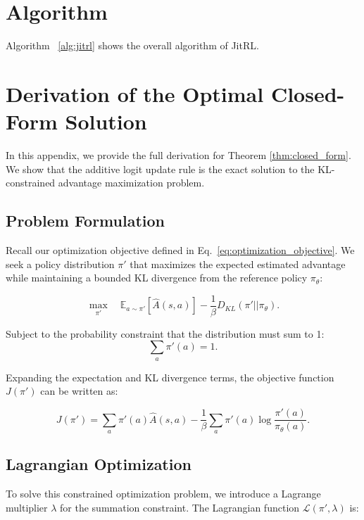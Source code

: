 \onecolumn
\appendix

\section{Algorithm}
\label{app:alg}
Algorithm ~\ref{alg:jitrl} shows the overall algorithm of JitRL.
 
\section{Derivation of the Optimal Closed-Form Solution}
\label{app:derivation}

In this appendix, we provide the full derivation for Theorem \ref{thm:closed_form}. We show that the additive logit update rule is the exact solution to the KL-constrained advantage maximization problem.

\subsection{Problem Formulation}

Recall our optimization objective defined in Eq.~\eqref{eq:optimization_objective}. We seek a policy distribution $\pi'$ that maximizes the expected estimated advantage while maintaining a bounded KL divergence from the reference policy $\pi_{\theta}$:

\begin{equation}
    \max_{\pi'} \quad \mathbb{E}_{a \sim \pi'} [\widehat A(s,a)] - \frac{1}{\beta} D_{KL}(\pi' || \pi_{\theta}).
\end{equation}

Subject to the probability constraint that the distribution must sum to 1:
\begin{equation}
    \sum_{a } \pi'(a) = 1.
\end{equation}

Expanding the expectation and KL divergence terms, the objective function $J(\pi')$ can be written as:

\begin{equation}
    J(\pi') = \sum_{a} \pi'(a) \widehat A(s,a) - \frac{1}{\beta} \sum_{a} \pi'(a) \log \frac{\pi'(a)}{\pi_{\theta}(a)}.
\end{equation}

\subsection{Lagrangian Optimization}

To solve this constrained optimization problem, we introduce a Lagrange multiplier $\lambda$ for the summation constraint. The Lagrangian function $\mathcal{L}(\pi', \lambda)$ is:

